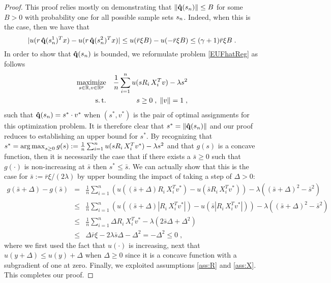 \begin{proof}
  This proof relies mostly on demonstrating that $\|{\bold{{\hat{q}}}}(s_n)\|\leq B$ for some $B>0$
  with probability one for all possible sample sets $s_n$. Indeed, when this is the case,
  then we have that
  \[
    |u(r\,{\bold{{\hat{q}}}}(s_n^1)^T x)-u(r\,{\bold{{\hat{q}}}}(s_n^2)^T x)| \leq u(\bar{r}\xi B)-u(-
    \bar{r}\xi B) \leq (\gamma + 1)\bar{r}\xi B\;.
  \] 
  In order to show that ${\bold{{\hat{q}}}}(s_n)$ is bounded, we reformulate problem
  \eqref{EUFhatReg} as follows
  \begin{eqnarray*}
    \operatorname*{maximize}_{s\in\mathbb{R},v\in\mathbb{R}^p} && \frac{1}{n}\sum_{i=1}^n u(s R_i\,X_i^T v) - \lambda s^2\\
    \operatorname{s.t.}&& s\geq0\;,\;\|v\|=1\;,
  \end{eqnarray*}
  such that ${\bold{{\hat{q}}}}(s_n) =s^*\cdot v^*$ when $(s^*,v^*)$ is the pair of optimal
  assignments for this optimization problem. It is therefore clear that
  $s^*=\|{\bold{{\hat{q}}}}(s_n)\|$ and our proof reduces to establishing an upper bound for $s^*$.
  By recognizing that
  $s^*=\operatorname*{arg\,max}_{s\geq 0} g(s):=\frac{1}{n}\sum_{i=1}^n u(s R_i\,X_i^T v^*) - \lambda s^2$
  and that $g(s)$ is a concave function, then it is necessarily the case that if there
  exists a $\bar{s}\geq 0$ such that $g(\cdot)$ is non-increasing at $\bar{s}$ then
  $s^* \leq \bar{s}$. We can actually show that this is the case for
  $\bar{s}:= \bar{r}\xi/(2\lambda)$ by upper bounding the impact of taking a step of
  $\Delta>0$:
  \begin{eqnarray*}
    g(\bar{s}+\Delta)-g(\bar{s}) &=& \frac{1}{n}\sum_{i=1}^n (u((\bar{s}+\Delta) R_i\,X_i^T v^*) - u(\bar{s} R_i\,X_i^T v^*) ) - \lambda ((\bar{s}+\Delta)^2-\bar{s}^2)\\
                                 &\leq& \frac{1}{n}\sum_{i=1}^n (u((\bar{s}+\Delta) |R_i\,X_i^T v^*|) - u(\bar{s} |R_i\,X_i^T v^*|) ) - \lambda ((\bar{s}+\Delta)^2-\bar{s}^2)\\
                                 &\leq & \frac{1}{n}\sum_{i=1}^n  \Delta R_i\,X_i^T v^* - \lambda (2\bar{s}\Delta + \Delta^2)\\
                                 &\leq &  \Delta \bar{r} \xi  - 2\lambda \bar{s}\Delta -  \Delta^2 = -  \Delta^2 \leq 0\;,
  \end{eqnarray*}
  where we first used the fact that $u(\cdot)$ is increasing, next that
  $u(y+\Delta)\leq u(y)+\Delta$ when $\Delta\geq 0$ since it is a concave function with a
  subgradient of one at zero.  Finally, we exploited assumptions \ref{ass:R} and
  \ref{ass:X}. This completes our proof.
\end{proof}

